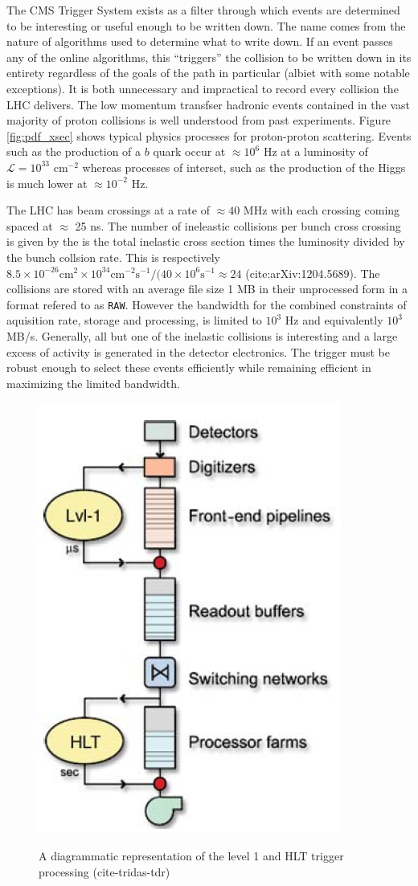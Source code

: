 {The CMS Trigger System exists as a filter through which events are determined to be interesting or 
useful enough to be written down. The name comes from the nature of algorithms used to determine 
what to write down. If an event passes any of the online algorithms, this ``triggers'' the collision to be 
written down in its entirety regardless of the goals of the path in particular 
 (albiet with some notable exceptions). It is both  unnecessary and impractical to record every
collision the LHC delivers. The low momentum transfser  hadronic events contained in the vast majority of
 proton collisions is well understood from past experiments. Figure \ref{fig:pdf_xsec}  shows 
typical physics processes for proton-proton scattering. Events such as the production 
of a $b$ quark  occur at $\approx 10^6$ Hz at a luminosity of $\mathcal{L} = 10^{33}$ cm$^{-2}$ 
whereas processes of interset, such as the production of the Higgs is much lower at $\approx 10^{-2}$ Hz.  

The LHC has beam crossings at a rate of $\approx 40$ MHz with 
each crossing coming spaced at $\approx$ 25 ns. The number of ineleastic collisions per bunch cross crossing
 is given by the  is the total inelastic cross section times the luminosity divided by the bunch collsion rate. 
This is respectively $8.5\times 10^{-26}\text{cm}^2 \times 10^{34}\text{cm}^{-2}\text{s}^{-1}/ (40 \times 10^6 \text{s}^{-1} \approx 24$ (cite:arXiv:1204.5689). 
The collisions are stored with an average file size 1 MB in their unprocessed form in a format refered to as \texttt{RAW}. However the bandwidth for the combined constraints of
 aquisition rate, storage and processing, is limited to $10^3$ Hz and equivalently $10^3$ MB/s. 
Generally, all but one of the inelastic collisions is interesting and a large excess of  
activity is generated in the detector electronics. The trigger must be robust enough to select 
these events efficiently while remaining  efficient in maximizing the limited bandwidth.  

\begin{figure}
\begin{center}
\includegraphics[width=.4\textwidth]{figures/exp_proj/cms-trigger}\\
\caption{A diagrammatic representation of the level 1 and HLT trigger processing (cite-tridas-tdr)}
\label{fig:l1_hlt_diagram}
\end{center}
\end{figure}

}
